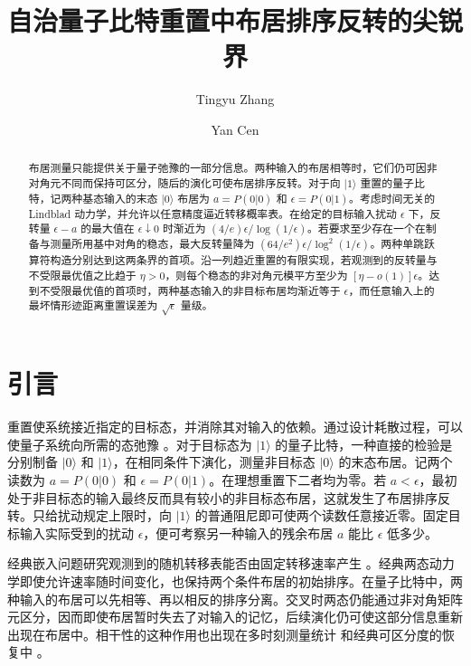 \documentclass[aps,pra,reprint,amsmath,amssymb,nofootinbib,floatfix,longbibliography]{revtex4-2}
\theoremstyle{aps}
\newcommand{\eps}{\epsilon}
\newcommand{\ket}[1]{|#1\rangle}
\begin{document}
\title{自治量子比特重置中布居排序反转的尖锐界}
\author{Tingyu Zhang}
\author{Yan Cen}

\begin{abstract}

布居测量只能提供关于量子弛豫的一部分信息。两种输入的布居相等时，它们仍可因非对角元不同而保持可区分，随后的演化可使布居排序反转。对于向 $\ket1$ 重置的量子比特，记两种基态输入的末态 $\ket0$ 布居为 $a=P(0|0)$ 和 $\eps=P(0|1)$。考虑时间无关的 Lindblad 动力学，并允许以任意精度逼近转移概率表。在给定的目标输入扰动 $\eps$ 下，反转量 $\eps-a$ 的最大值在 $\eps\downarrow0$ 时渐近为 $(4/e)\eps/\log(1/\eps)$。若要求至少存在一个在制备与测量所用基中对角的稳态，最大反转量降为 $(64/e^2)\eps/\log^2(1/\eps)$。两种单跳跃算符构造分别达到这两条界的首项。沿一列趋近重置的有限实现，若观测到的反转量与不受限最优值之比趋于 $\eta>0$，则每个稳态的非对角元模平方至少为 $[\eta-o(1)]\eps$。达到不受限最优值的首项时，两种基态输入的非目标布居均渐近等于 $\eps$，而任意输入上的最坏情形迹距离重置误差为 $\sqrt\eps$ 量级。

\end{abstract}
\maketitle

\section{引言}\label{sec:setting}

重置使系统接近指定的目标态，并消除其对输入的依赖。通过设计耗散过程，可以使量子系统向所需的态弛豫 \cite{Kraus2008,Verstraete2009}。对于目标态为 $\ket1$ 的量子比特，一种直接的检验是分别制备 $\ket0$ 和 $\ket1$，在相同条件下演化，测量非目标态 $\ket0$ 的末态布居。记两个读数为 $a=P(0|0)$ 和 $\eps=P(0|1)$。在理想重置下二者均为零。若 $a<\eps$，最初处于非目标态的输入最终反而具有较小的非目标态布居，这就发生了布居排序反转。只给扰动规定上限时，向 $\ket1$ 的普通阻尼即可使两个读数任意接近零。固定目标输入实际受到的扰动 $\eps$，便可考察另一种输入的残余布居 $a$ 能比 $\eps$ 低多少。

经典嵌入问题研究观测到的随机转移表能否由固定转移速率产生 \cite{Kingman1962,Davies2010}。经典两态动力学即使允许速率随时间变化，也保持两个条件布居的初始排序。在量子比特中，两种输入的布居可以先相等、再以相反的排序分离。交叉时两态仍能通过非对角矩阵元区分，因而即使布居暂时失去了对输入的记忆，后续演化仍可使这部分信息重新出现在布居中。相干性的这种作用也出现在多时刻测量统计 \cite{Smirne2019} 和经典可区分度的恢复中 \cite{Benatti2024}。
\end{document}
